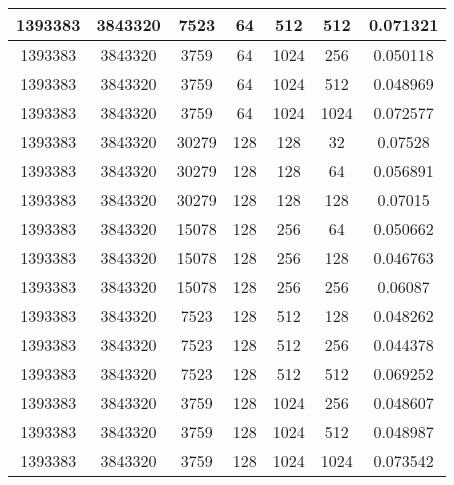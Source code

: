 \documentclass[9pt]{article}
\begin{document}
\begin{tabular}{|c|c|c|c|c|c|c| }
\hline
1393383  & 3843320  & 7523  & 64  & 512  & 512  & 0.071321 \\
\hline
1393383  & 3843320  & 3759  & 64  & 1024  & 256  & 0.050118 \\
\hline
1393383  & 3843320  & 3759  & 64  & 1024  & 512  & 0.048969 \\
\hline
1393383  & 3843320  & 3759  & 64  & 1024  & 1024  & 0.072577 \\
\hline
1393383  & 3843320  & 30279  & 128  & 128  & 32  & 0.07528 \\
\hline
1393383  & 3843320  & 30279  & 128  & 128  & 64  & 0.056891 \\
\hline
1393383  & 3843320  & 30279  & 128  & 128  & 128  & 0.07015 \\
\hline
1393383  & 3843320  & 15078  & 128  & 256  & 64  & 0.050662 \\
\hline
1393383  & 3843320  & 15078  & 128  & 256  & 128  & 0.046763 \\
\hline
1393383  & 3843320  & 15078  & 128  & 256  & 256  & 0.06087 \\
\hline
1393383  & 3843320  & 7523  & 128  & 512  & 128  & 0.048262 \\
\hline
1393383  & 3843320  & 7523  & 128  & 512  & 256  & 0.044378 \\
\hline
1393383  & 3843320  & 7523  & 128  & 512  & 512  & 0.069252 \\
\hline
1393383  & 3843320  & 3759  & 128  & 1024  & 256  & 0.048607 \\
\hline
1393383  & 3843320  & 3759  & 128  & 1024  & 512  & 0.048987 \\
\hline
1393383  & 3843320  & 3759  & 128  & 1024  & 1024  & 0.073542 \\
\hline
\end{tabular}
 
\end{document}
